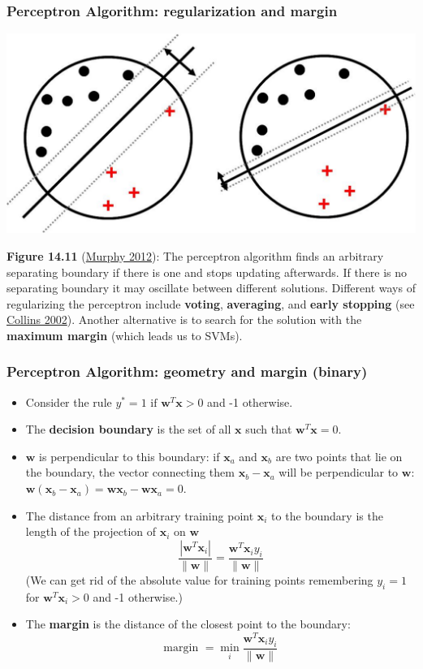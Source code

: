 \documentclass[ignorenonframetext,plain]{beamer}
\renewcommand{\vec}{\mathbf}
\begin{document}
\begin{frame}\frametitle{Perceptron Algorithm: regularization and margin}
\begin{center}
\includegraphics[width=\textwidth]{images/largeMarginPrinciple2.pdf}
\end{center}\footnotesize
{\bf Figure 14.11} (\href{http://www.cs.ubc.ca/~murphyk/MLbook}{Murphy
  2012}): The perceptron algorithm finds an arbitrary separating
boundary if there is one and stops updating afterwards.  If there is
no separating boundary it may oscillate between different solutions.
Different ways of regularizing the perceptron include {\bf voting},
{\bf averaging}, and {\bf early stopping} (see
\href{http://aclweb.org/anthology//W/W02/W02-1001.pdf}{Collins 2002}).
Another alternative is to search for the solution with the {\bf
  maximum margin} (which leads us to SVMs).
\end{frame}

\begin{frame}\frametitle{Perceptron Algorithm: geometry and margin (binary)}
\begin{itemize}
\item Consider the rule $ y^* = 1 \text{ if } \vec{w}^T
  \vec{x} > 0$ and -1 otherwise.
\item The {\bf decision boundary} is the set of all $\vec{x}$ such
  that $\vec{w}^T \vec{x} = 0$.
\item $\vec{w}$ is perpendicular to this boundary: if $\vec{x}_a$ and
  $\vec{x}_b$ are two points that lie on the boundary, the vector
  connecting them $\vec{x}_b - \vec{x}_a$ will be perpendicular to
  $\vec{w}$: $\vec{w}(\vec{x}_b - \vec{x}_a) = \vec{w}\vec{x}_b -
  \vec{w}\vec{x}_a = 0$.
\item The distance from an arbitrary training point $\vec{x}_i$ to the
  boundary is the length of the projection of $\vec{x}_i$ on
  $\vec{w}$ \[
  \frac{|\vec{w}^T\vec{x}_i|}{\|\vec{w}\|} = \frac{\vec{w}^T\vec{x}_i y_i}{\|\vec{w}\|}
\]
(We can get rid of the absolute value for training points
  remembering $y_i=1$ for $\vec{w}^T\vec{x}_i>0$ and -1 otherwise.)
\item The {\bf margin} is the distance of the closest point to the
  boundary:\[
  \text{margin } = \min_i \frac{\vec{w}^T\vec{x}_i y_i}{\|\vec{w}\|}
\]
\end{itemize}
\end{frame}
\end{document}
